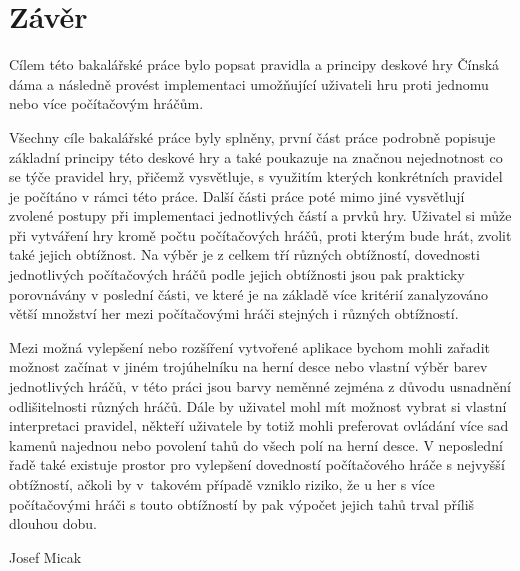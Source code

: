 \chapter{Závěr}
Cílem této bakalářské práce bylo popsat pravidla a principy deskové hry Čínská dáma a následně provést implementaci umožňující uživateli hru proti jednomu nebo více počítačovým hráčům. 

Všechny cíle bakalářské práce byly splněny, první část práce podrobně popisuje základní principy této deskové hry a také poukazuje na značnou nejednotnost co se týče pravidel hry, přičemž vysvětluje, s využitím kterých konkrétních pravidel je počítáno v rámci této práce. Další části práce poté mimo jiné vysvětlují zvolené postupy při implementaci jednotlivých částí a prvků hry. Uživatel si může při vytváření hry kromě počtu počítačových hráčů, proti kterým bude hrát, zvolit také jejich obtížnost. Na výběr je z celkem tří různých obtížností, dovednosti jednotlivých počítačových hráčů podle jejich obtížnosti jsou pak prakticky porovnávány v poslední části, ve které je na základě více kritérií zanalyzováno větší množství her mezi počítačovými hráči stejných i různých obtížností.

Mezi možná vylepšení nebo rozšíření vytvořené aplikace bychom mohli zařadit možnost začínat v jiném trojúhelníku na herní desce nebo vlastní výběr barev jednotlivých hráčů, v této práci jsou barvy neměnné zejména z důvodu usnadnění odlišitelnosti různých hráčů. Dále by uživatel mohl mít možnost vybrat si vlastní interpretaci pravidel, někteří uživatele by totiž mohli preferovat ovládání více sad kamenů najednou nebo povolení tahů do všech polí na herní desce. V neposlední řadě také existuje prostor pro vylepšení dovedností počítačového hráče s nejvyšší obtížností, ačkoli by v~takovém případě vzniklo riziko, že u her s více počítačovými hráči s touto obtížností by pak výpočet jejich tahů trval příliš dlouhou dobu.

\hfill Josef Micak
\endinput